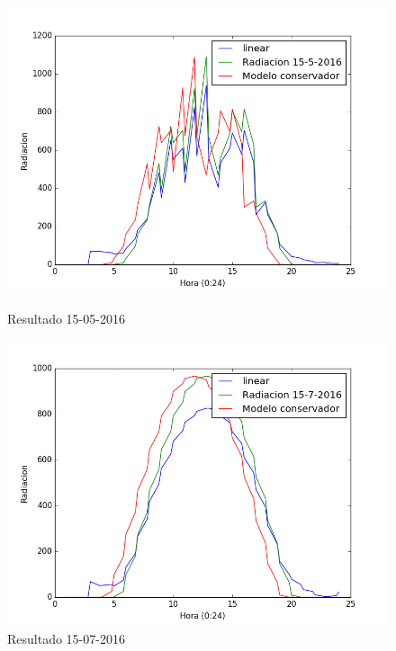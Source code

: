 \begin{figure}[htb]
		\includegraphics[width=\linewidth]{figures/linear_2016051520160515.png}
		\caption{Resultado 15-05-2016 \label{resultado_linear_3}}
\endminipage\hfill
{}
		\includegraphics[width=\linewidth]{figures/linear_2016071520160715.png}
		\caption{Resultado 15-07-2016 \label{resultado_linear_4}}
\endminipage\hfill
\end{figure}

